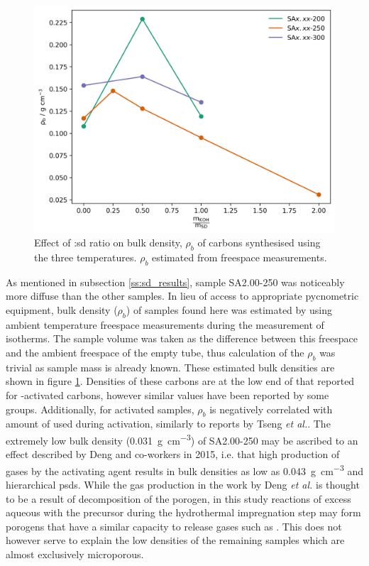 \begin{figure}[ht!]
    \centering
    \includegraphics[width=\columnwidth, keepaspectratio]{4-impregnation/figs/SD_density.png}
    \caption{Effect of :\acrshort{sd} ratio on bulk density, $\rho_b$ of carbons synthesised using the three  temperatures. $\rho_b$ estimated from freespace measurements.}
    \label{fig:SA_density}
\end{figure}

As mentioned in subsection \ref{ss:sd_results}, sample SA2.00-250 was noticeably more diffuse than the other samples. In lieu of access to appropriate pycnometric equipment, bulk density ($\rho_{b}$) of samples found here was estimated by using ambient temperature  freespace measurements during the measurement of  isotherms. The sample volume was taken as the difference between this freespace and the ambient freespace of the empty tube, thus calculation of the $\rho_{b}$ was trivial as sample mass is already known. These estimated bulk densities are shown in figure \ref{fig:SA_density}. Densities of these carbons are at the low end of that  reported for -activated carbons,\citep{casco2015very, machnikowski2012adsorption, Altwala2020Predictable} however similar values have been reported by some groups.\citep{tseng2008effects, rashid2016koh, Guan2011Methane} Additionally, for  activated samples, $\rho_b$ is negatively correlated with amount of  used during activation, similarly to reports by Tseng \textit{et al.}.\citep{tseng2008effects} The extremely low bulk density (\qty{0.031}{\gram\per\cm\cubed}) of SA2.00-250 may be ascribed to an effect described by Deng and co-workers in 2015, i.e. that high production of gases by the activating agent results in bulk densities as low as \qty{0.043}{\gram\per\cm\cubed} and hierarchical \glspl{psd}.\citep{Deng2015Inspired} While the gas production in the work by Deng \textit{et al.} is thought to be a result of decomposition of the  \gls{porogen}, in this study reactions of excess aqueous  with the precursor during the hydrothermal impregnation step may form \glspl{porogen} that have a similar capacity to release gases such as . This does not however serve to explain the low densities of the remaining samples which are almost exclusively microporous. 

